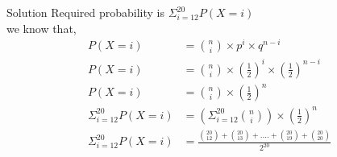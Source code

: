 \documentclass{beamer}
\providecommand{\brak}[1]{\ensuremath{\left(#1\right)}}
\begin{document}
\begin{frame}{Solution}
Required probability is $\Sigma ^{20}_{i=12} P\brak{X=i}$\\
we know that,
\begin{align}
 P\brak{X=i} &= \binom{n}{i} \times p^{i} \times q^{n-i}\\
 P\brak{X=i} &= \binom{n}{i} \times \brak{\frac{1}{2}}^i \times \brak{\frac{1}{2}}^{n-i}\\
 P\brak{X=i} &= \binom{n}{i} \times \brak{\frac{1}{2}}^n\\
 \Sigma ^{20}_{i=12} P\brak{X=i} &= \brak{\Sigma ^{20}_{i=12} \binom{n}{i}} \times \brak{\frac{1}{2}}^n\\
 \Sigma ^{20}_{i=12} P\brak{X=i} &= \frac{\binom{20}{12}+\binom{20}{13}+....+\binom{20}{19}+\binom{20}{20}}{2^{20}}
\end{align}

\end{frame}
\end{document}
